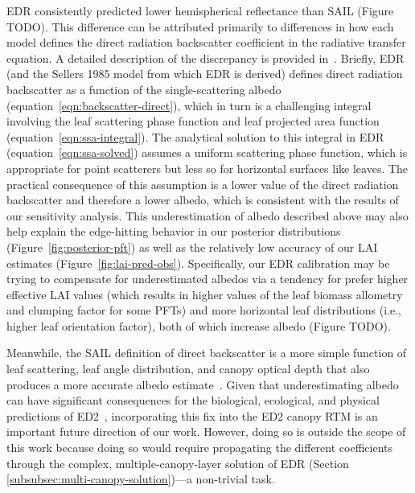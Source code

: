 EDR consistently predicted lower hemispherical reflectance than SAIL (Figure TODO).
This difference can be attributed primarily to differences in how each model defines the direct radiation backscatter coefficient in the radiative transfer equation.
A detailed description of the discrepancy is provided in~\citet{yuan2017reexamination}.
Briefly, EDR (and the Sellers 1985 model from which EDR is derived) defines direct radiation backscatter as a function of the single-scattering albedo (equation~\ref{eqn:backscatter-direct}), which in turn is a challenging integral involving the leaf scattering phase function and leaf projected area function (equation~\ref{eqn:ssa-integral}).
The analytical solution to this integral in EDR (equation~\ref{eqn:ssa-solved}) assumes a uniform scattering phase function, which is appropriate for point scatterers but less so for horizontal surfaces like leaves.
The practical consequence of this assumption is a lower value of the direct radiation backscatter and therefore a lower albedo, which is consistent with the results of our sensitivity analysis.
This underestimation of albedo described above may also help explain the edge-hitting behavior in our posterior distributions (Figure~\ref{fig:posterior-pft}) as well as the relatively low accuracy of our LAI estimates (Figure~\ref{fig:lai-pred-obs}).
Specifically, our EDR calibration may be trying to compensate for underestimated albedos via a tendency for prefer higher effective LAI values (which results in higher values of the leaf biomass allometry and clumping factor for some PFTs) and more horizontal leaf distributions (i.e., higher leaf orientation factor), both of which increase albedo (Figure TODO).

Meanwhile, the SAIL definition of direct backscatter is a more simple function of leaf scattering, leaf angle distribution, and canopy optical depth that also produces a more accurate albedo estimate~\citep{yuan2017reexamination}.
Given that underestimating albedo can have significant consequences for the biological, ecological, and physical predictions of ED2~\citep{viskari_2019_influence}, incorporating this fix into the ED2 canopy RTM is an important future direction of our work.
However, doing so is outside the scope of this work because doing so would require propagating the different coefficients through the complex, multiple-canopy-layer solution of EDR (Section \ref{subsubsec:multi-canopy-solution})---a non-trivial task.

